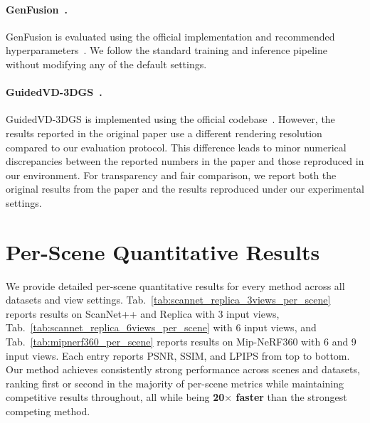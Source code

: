 \documentclass[runningheads]{llncs}
\begin{document}
\paragraph{GenFusion~\cite{wu2025genfusion}.}
GenFusion is evaluated using the official implementation and recommended hyperparameters~\cite{wu2025genfusion}. We follow the standard training and inference pipeline without modifying any of the default settings.

\paragraph{GuidedVD-3DGS~\cite{zhong2025taming}.}
GuidedVD-3DGS is implemented using the official codebase~\cite{zhong2025taming}. However, the results reported in the original paper use a different rendering resolution compared to our evaluation protocol. This difference leads to minor numerical discrepancies between the reported numbers in the paper and those reproduced in our environment. For transparency and fair comparison, we report both the original results from the paper and the results reproduced under our experimental settings.

\section{Per-Scene Quantitative Results}
\label{sec:per_scene}

We provide detailed per-scene quantitative results for every method across all datasets and view settings. Tab.~\ref{tab:scannet_replica_3views_per_scene} reports results on ScanNet++ and Replica with 3 input views, Tab.~\ref{tab:scannet_replica_6views_per_scene} with 6 input views, and Tab.~\ref{tab:mipnerf360_per_scene} reports results on Mip-NeRF360 with 6 and 9 input views. Each entry reports PSNR, SSIM, and LPIPS from top to bottom. Our method achieves consistently strong performance across scenes and datasets, ranking first or second in the majority of per-scene metrics while maintaining competitive results throughout, all while being \textbf{20$\times$ faster} than the strongest competing method.
\end{document}
